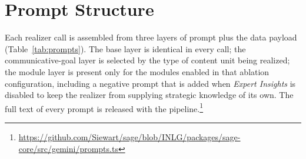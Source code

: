 \documentclass[11pt]{article}
\begin{document}
\appendix
\makeatletter
\renewcommand{\@seccntformat}[1]{Appendix~\csname the#1\endcsname.\quad}
\makeatother
{}
\renewcommand{\thetable}{\thesection\arabic{table}}
\renewcommand{\thefigure}{\thesection\arabic{figure}}

\section{Prompt Structure}
\label{app:prompts}
Each realizer call is assembled from three layers of prompt plus the data payload (Table~\ref{tab:prompts}). The base layer is identical in every call; the communicative-goal layer is selected by the type of content unit being realized; the module layer is present only for the modules enabled in that ablation configuration, including a negative prompt that is added when \emph{Expert Insights} is disabled to keep the realizer from supplying strategic knowledge of its own. The full text of every prompt is released with the pipeline.\footnote{\label{fn:repo}\url{https://github.com/Siewart/sage/blob/INLG/packages/sage-core/src/gemini/prompts.ts}}
\end{document}
